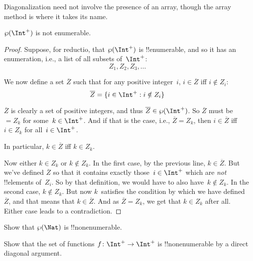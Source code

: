 \documentclass[../../include/open-logic-section]{subfiles}
\begin{document}
Diagonalization need not involve the presence of an array, though the
array method is where it takes its name.

\begin{thm}
$\Pow{\Int^+}$ is not enumerable.
\end{thm}

\begin{proof}
Suppose, for reductio, that $\Pow{\Int^+}$ is !!{enumerable}, and so
it has an enumeration, i.e., a list of all subsets of~$\Int^+$:
\[
Z_{1}, Z_{2}, Z_{3}, \dots
\]

We now define a set $\overline{Z}$ such that for any positive
integer~$i$, $i \in \overline{Z}$ iff $i \notin Z_{i}$:
\[
\overline{Z} = \Setabs{i \in \Int^+}{i \notin Z_i}
\]

$\overline{Z}$ is clearly a set of positive integers, and thus $\overline{Z}
\in \Pow{\Int^+}$. So $\overline{Z}$ must be $= Z_k$ for some~$k \in
\Int^+$. And if that is the case, i.e., $\overline{Z} = Z_k$, then $i
\in \overline{Z}$ iff $i \in Z_k$ for all~$i \in \Int^+$.

In particular, $k \in \overline{Z}$ iff $k \in Z_k$.

Now either $k \in Z_{k}$ or $k \notin Z_{k}$. In the first case, by
the previous line, $k \in \overline{Z}$. But we've defined
$\overline{Z}$ so that it contains exactly those~$i \in \Int^+$ which
are \emph{not} !!{element}s of~$Z_i$. So by that definition, we would
have to also have~$k \notin Z_k$. In the second case, $k \notin Z_k$.
But now $k$~satisfies the condition by which we have
defined~$\overline{Z}$, and that means that $k \in \overline{Z}$. And
as $\overline{Z} = Z_k$, we get that $k \in Z_k$ after all. Either
case leads to a contradiction.
\end{proof}

\begin{prob}
Show that $\Pow{\Nat}$ is !!{nonenumerable}.
\end{prob}

\begin{prob}
Show that the set of functions $f \colon \Int^+ \to \Int^+$ is
!!{nonenumerable} by a direct diagonal argument.
\end{prob}
\end{document}
